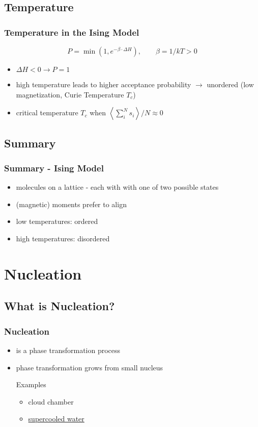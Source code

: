 \documentclass{beamer}
\begin{document}
\subsection{Temperature}
\begin{frame}\frametitle{Temperature in the Ising Model}
\begin{equation*}
P = \operatorname{min}\left(1,e^{-\beta\cdot \Delta H}\right),\qquad \beta = 1/kT > 0
\end{equation*}
\begin{itemize}
\item $\Delta H < 0 \rightarrow P = 1$
\item high temperature leads to higher acceptance probability
$\rightarrow$ unordered (low magnetization, Curie Temperature $T_c$)
\item critical temperature $T_c$ when $\left<\sum_i^N s_i\right>/N \approx 0$
\end{itemize}
\end{frame}


\subsection{Summary}
\begin{frame}\frametitle{Summary - Ising Model}
\begin{itemize}
\item molecules on a lattice - each with with one of two possible states
\item (magnetic) moments prefer to align
\item low temperatures: ordered
\item high temperatures: disordered
\end{itemize}
\end{frame}





\section{Nucleation}
\subsection{What is Nucleation?}
\begin{frame}\frametitle{Nucleation}
\begin{itemize}
\item is a phase transformation process
\item phase transformation grows from small nucleus
\begin{exampleblock}{Examples}
\begin{itemize}
\item
cloud chamber
\item
\href{http://www.youtube.com/watch?v=pTdiTe3x0Bo}{supercooled water}
\end{itemize}
\end{exampleblock}
\end{itemize}
\end{frame}
\end{document}
